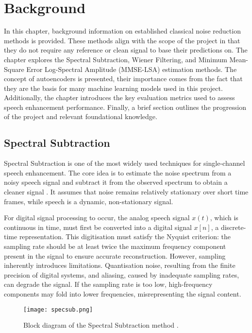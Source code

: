 \graphicspath{{content/chapters/2_background/figures/}}
\chapter{Background}
\label{chp:background}

In this chapter, background information on established classical noise reduction methods is provided. These methods align with the scope of the project in that they do not require any reference or clean signal to base their predictions on. The chapter explores the Spectral Subtraction, Wiener Filtering, and Minimum Mean-Square Error Log-Spectral Amplitude (MMSE-LSA) estimation methods. The concept of autoencoders is presented, their importance comes from the fact that they are the basis for many machine learning models used in this project. Additionally, the chapter introduces the key evaluation metrics used to assess speech enhancement performance. Finally, a brief section outlines the progression of the project and relevant foundational knowledge.


\section{Spectral Subtraction}
\label{sec:spectral_subtraction}

Spectral Subtraction is one of the most widely used techniques for single-channel speech enhancement. The core idea is to estimate the noise spectrum from a noisy speech signal and subtract it from the observed spectrum to obtain a cleaner signal \cite{loizou2013speech}. It assumes that noise remains relatively stationary over short time frames, while speech is a dynamic, non-stationary signal.

For digital signal processing to occur, the analog speech signal \(x(t)\), which is continuous in time, must first be converted into a digital signal \(x[n]\), a discrete-time representation. This digitisation must satisfy the Nyquist criterion: the sampling rate should be at least twice the maximum frequency component present in the signal to ensure accurate reconstruction. However, sampling inherently introduces limitations. Quantisation noise, resulting from the finite precision of digital systems, and aliasing, caused by inadequate sampling rates, can degrade the signal. If the sampling rate is too low, high-frequency components may fold into lower frequencies, misrepresenting the signal content.

\begin{figure}[h]
    \centering
    \texttt{[image: specsub.png]}
    \caption{\label{fig:SSBlock} Block diagram of the Spectral Subtraction method \cite{dubey2016evaluation}.}
\end{figure}

